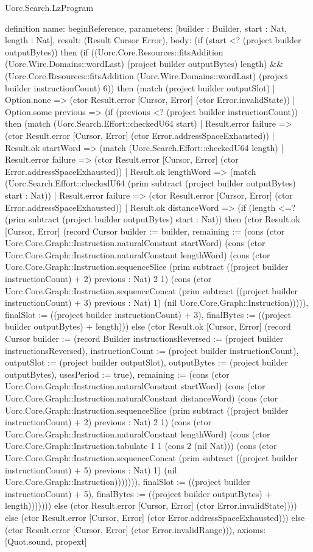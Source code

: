 \begin{lexlean}{Uorc.Search.LzProgram}
\begin{semanticmodule}
definition{
  name: beginReference,
  parameters: [builder : Builder, start : Nat, length : Nat],
  result: (Result Cursor Error),
  body: (if (start <? (project builder outputBytes)) then (if ((Uorc.Core.Resources::fitsAddition (Uorc.Wire.Domains::wordLast) (project builder outputBytes) length) && (Uorc.Core.Resources::fitsAddition (Uorc.Wire.Domains::wordLast) (project builder instructionCount) 6)) then (match (project builder outputSlot)
    | Option.none => (ctor Result.error [Cursor, Error] (ctor Error.invalidState))
    | Option.some previous => (if (previous <? (project builder instructionCount)) then (match (Uorc.Search.Effort::checkedU64 start)
      | Result.error failure => (ctor Result.error [Cursor, Error] (ctor Error.addressSpaceExhausted))
      | Result.ok startWord => (match (Uorc.Search.Effort::checkedU64 length)
        | Result.error failure => (ctor Result.error [Cursor, Error] (ctor Error.addressSpaceExhausted))
        | Result.ok lengthWord => (match (Uorc.Search.Effort::checkedU64 (prim subtract (project builder outputBytes) start : Nat))
          | Result.error failure => (ctor Result.error [Cursor, Error] (ctor Error.addressSpaceExhausted))
          | Result.ok distanceWord => (if (length <=? (prim subtract (project builder outputBytes) start : Nat)) then (ctor Result.ok [Cursor, Error] (record Cursor {builder := builder, remaining := (cons (ctor Uorc.Core.Graph::Instruction.naturalConstant startWord) (cons (ctor Uorc.Core.Graph::Instruction.naturalConstant lengthWord) (cons (ctor Uorc.Core.Graph::Instruction.sequenceSlice (prim subtract ((project builder instructionCount) + 2) previous : Nat) 2 1) (cons (ctor Uorc.Core.Graph::Instruction.sequenceConcat (prim subtract ((project builder instructionCount) + 3) previous : Nat) 1) (nil Uorc.Core.Graph::Instruction))))), finalSlot := ((project builder instructionCount) + 3), finalBytes := ((project builder outputBytes) + length)})) else (ctor Result.ok [Cursor, Error] (record Cursor {builder := (record Builder {instructionsReversed := (project builder instructionsReversed), instructionCount := (project builder instructionCount), outputSlot := (project builder outputSlot), outputBytes := (project builder outputBytes), usesPeriod := true}), remaining := (cons (ctor Uorc.Core.Graph::Instruction.naturalConstant startWord) (cons (ctor Uorc.Core.Graph::Instruction.naturalConstant distanceWord) (cons (ctor Uorc.Core.Graph::Instruction.sequenceSlice (prim subtract ((project builder instructionCount) + 2) previous : Nat) 2 1) (cons (ctor Uorc.Core.Graph::Instruction.naturalConstant lengthWord) (cons (ctor Uorc.Core.Graph::Instruction.tabulate 1 1 (cons 2 (nil Nat))) (cons (ctor Uorc.Core.Graph::Instruction.sequenceConcat (prim subtract ((project builder instructionCount) + 5) previous : Nat) 1) (nil Uorc.Core.Graph::Instruction))))))), finalSlot := ((project builder instructionCount) + 5), finalBytes := ((project builder outputBytes) + length)})))))) else (ctor Result.error [Cursor, Error] (ctor Error.invalidState)))) else (ctor Result.error [Cursor, Error] (ctor Error.addressSpaceExhausted))) else (ctor Result.error [Cursor, Error] (ctor Error.invalidRange))),
  axioms: [Quot.sound, propext]
}


\end{semanticmodule}
\end{lexlean}
